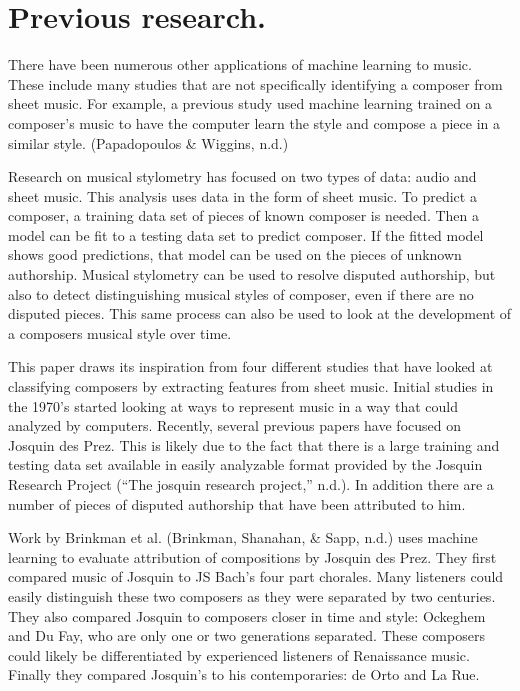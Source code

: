\documentclass[12pt,twoside]{reedthesis}
\theoremstyle{definition}
\theoremstyle{definition}
\theoremstyle{definition}
\theoremstyle{remark}
\begin{document}
\section{Previous research.}\label{previous-research.}

There have been numerous other applications of machine learning to
music. These include many studies that are not specifically identifying
a composer from sheet music. For example, a previous study used machine
learning trained on a composer's music to have the computer learn the
style and compose a piece in a similar style. (Papadopoulos \& Wiggins,
n.d.)

Research on musical stylometry has focused on two types of data: audio
and sheet music. This analysis uses data in the form of sheet music. To
predict a composer, a training data set of pieces of known composer is
needed. Then a model can be fit to a testing data set to predict
composer. If the fitted model shows good predictions, that model can be
used on the pieces of unknown authorship. Musical stylometry can be used
to resolve disputed authorship, but also to detect distinguishing
musical styles of composer, even if there are no disputed pieces. This
same process can also be used to look at the development of a composers
musical style over time.

This paper draws its inspiration from four different studies that have
looked at classifying composers by extracting features from sheet music.
Initial studies in the 1970's started looking at ways to represent music
in a way that could analyzed by computers. Recently, several previous
papers have focused on Josquin des Prez. This is likely due to the fact
that there is a large training and testing data set available in easily
analyzable format provided by the Josquin Research Project (``The
josquin research project,'' n.d.). In addition there are a number of
pieces of disputed authorship that have been attributed to him.

Work by Brinkman et al. (Brinkman, Shanahan, \& Sapp, n.d.) uses machine
learning to evaluate attribution of compositions by Josquin des Prez.
They first compared music of Josquin to JS Bach's four part chorales.
Many listeners could easily distinguish these two composers as they were
separated by two centuries. They also compared Josquin to composers
closer in time and style: Ockeghem and Du Fay, who are only one or two
generations separated. These composers could likely be differentiated by
experienced listeners of Renaissance music. Finally they compared
Josquin's to his contemporaries: de Orto and La Rue.
\end{document}
